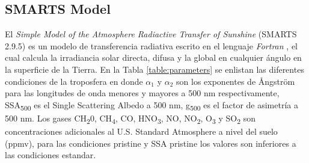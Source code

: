 \subsection{SMARTS Model}
El \textit{Simple Model of the Atmosphere Radiactive Transfer of Sunshine} (SMARTS 2.9.5) es un modelo de transferencia radiativa escrito en el lenguaje \textit{Fortran} \cite{Gueymard1995}, el cual calcula la irradiancia solar directa, difusa y la global en cualquier ángulo en la superficie de la Tierra. En la Tabla \ref{table:parameters} se enlistan las diferentes condiciones de la troposfera en donde $\alpha_1$ y $\alpha_2$ son los exponentes de \AA ngstr\"om para las longitudes de onda menores y mayores a 500 nm respectivamente, SSA\textsubscript{500} es el Single Scattering Albedo a 500 nm, g\textsubscript{500} es el factor de asimetría a 500 nm. Los gases CH\textsubscript{2}0, CH\textsubscript{4}, CO, HNO\textsubscript{3}, NO, NO\textsubscript{2}, O\textsubscript{3} y SO\textsubscript{2} son concentraciones adicionales al U.S. Standard Atmosphere a nivel del suelo (ppmv), para las condiciones pristine y SSA pristine los valores son inferiores a las condiciones estandar. \cite{Gueymard1995}
